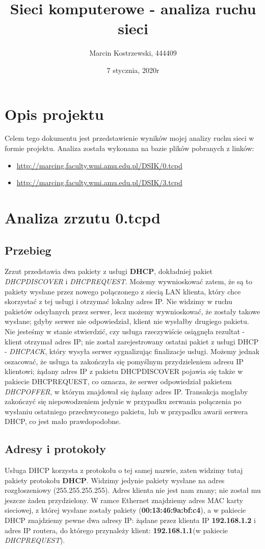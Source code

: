 \documentclass{article}
\title{Sieci komputerowe - analiza ruchu sieci}
\author{Marcin Kostrzewski, 444409}
\date{7 stycznia, 2020r}
\begin{document}
\maketitle
\newpage
\tableofcontents
\newpage

\section{Opis projektu}
Celem tego dokumentu jest przedstawienie wyników mojej analizy ruchu sieci w formie projektu. Analiza została
wykonana na bazie plików pobranych z linków:
\begin{itemize}
    \item \url{http://marcing.faculty.wmi.amu.edu.pl/DSIK/0.tcpd}
    \item \url{http://marcing.faculty.wmi.amu.edu.pl/DSIK/3.tcpd}
\end{itemize}

\section{Analiza zrzutu 0.tcpd}

\subsection{Przebieg}
Zrzut przedstawia dwa pakiety z usługi \textbf{DHCP}, dokładniej pakiet \textit{DHCPDISCOVER} i \textit{DHCPREQUEST}.
Możemy wywnioskować zatem, że są to pakiety wysłane przez nowego połączonego z siecią LAN klienta,
który chce skorzystać z tej usługi i otrzymać lokalny adres IP. Nie widzimy w ruchu pakietów odsyłanych przez
serwer, lecz możemy wywnioskować, że zostały takowe wysłane; gdyby serwer nie odpowiedział, klient nie wysłałby drugiego pakietu.
Nie jesteśmy w stanie stwierdzić, czy usługa rzeczywiście osiągnęła rezultat - klient otrzymał adres IP;
nie został zarejestrowany ostatni pakiet z usługi DHCP - \textit{DHCPACK}, który wysyła serwer sygnalizując
finalizacje usługi. Możemy jednak oszacować, że usługa ta zakończyła się pomyślnym przydzieleniem adresu IP 
klientowi; żądany adres IP z pakietu DHCPDISCOVER pojawia się także w pakiecie DHCPREQUEST, co oznacza, że
serwer odpowiedział pakietem \textit{DHCPOFFER}, w którym znajdował się żądany adres IP. Transakcja
mogłaby zakończyć się niepowodzeniem jedynie w przypadku zerwania połączenia po wysłaniu ostatniego 
przechwyconego pakietu, lub w przypadku awarii serwera DHCP, co jest mało prawdopodobne.

\subsection{Adresy i protokoły}
Usługa DHCP korzysta z protokołu o tej samej nazwie, zaten widzimy tutaj pakiety protokołu \textbf{DHCP}.
Widzimy jedynie pakiety wysłane na adres rozgłoszeniowy (255.255.255.255). Adres klienta 
nie jest nam znany; nie został mu jeszcze żaden przydzielony. W ramce Ethernet znajdziemy
adres MAC karty sieciowej, z której wysłane zostały pakiety (\textbf{00:13:46:9a:bf:c4}),
a w pakiecie DHCP znajdziemy pewne dwa adresy IP: żądane przez klienta IP \textbf{192.168.1.2}
i adres IP routera, do którego przynależy klient: \textbf{192.168.1.1}(w pakiecie \textit{DHCPREQUEST}).
\end{document}
